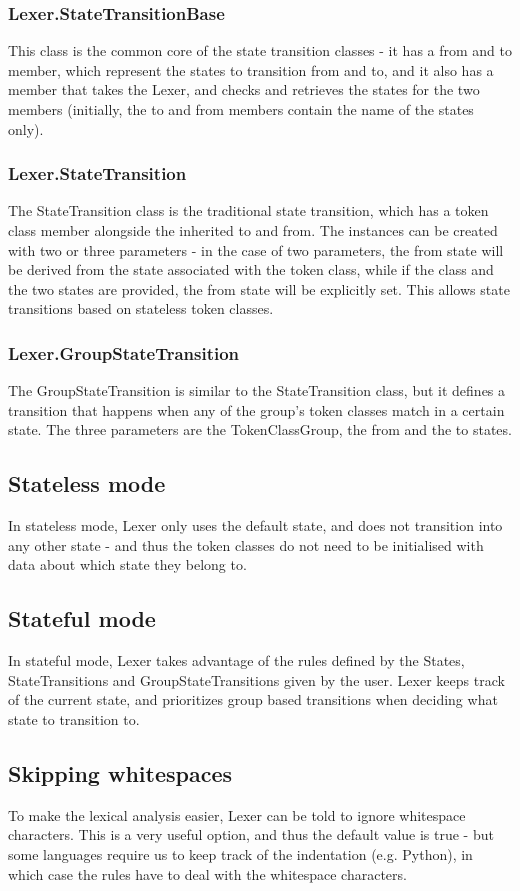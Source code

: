 \subsubsection{Lexer.StateTransitionBase}
This class is the common core of the state transition classes - it has a from and to member, which represent the states to transition from and to, and it also has a member that takes the Lexer, and checks and retrieves the states for the two members (initially, the to and from members contain the name of the states only).
\subsubsection{Lexer.StateTransition}
The StateTransition class is the traditional state transition, which has a token class member alongside the inherited to and from. The instances can be created with two or three parameters - in the case of two parameters, the from state will be derived from the state associated with the token class, while if the class and the two states are provided, the from state will be explicitly set. This allows state transitions based on stateless token classes.
\subsubsection{Lexer.GroupStateTransition} 
The GroupStateTransition is similar to the StateTransition class, but it defines a transition that happens when any of the group's token classes match in a certain state. The three parameters are the TokenClassGroup, the from and the to states.
\subsection{Stateless mode}
In stateless mode, Lexer only uses the default state, and does not transition into any other state - and thus the token classes do not need to be initialised with data about which state they belong to.
\subsection{Stateful mode}
In stateful mode, Lexer takes advantage of the rules defined by the States, StateTransitions and GroupStateTransitions given by the user. Lexer keeps track of the current state, and prioritizes group based transitions when deciding what state to transition to.
\subsection{Skipping whitespaces}
To make the lexical analysis easier, Lexer can be told to ignore whitespace characters. This is a very useful option, and thus the default value is true - but some languages require us to keep track of the indentation (e.g. Python), in which case the rules have to deal with the whitespace characters.
